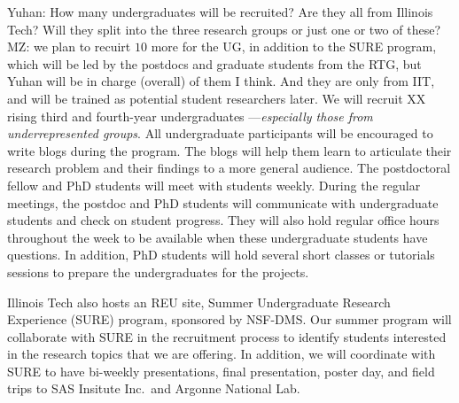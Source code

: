 \documentclass[11pt]{NSFamsart}
\newcommand{\YuhanNote}[1]{{\color{violet} Yuhan: #1}}
\begin{document}
 \YuhanNote{How many undergraduates will be recruited? Are they all from Illinois Tech? Will they split into the three research groups or just one or two of these?}{\color{blue} MZ: we plan to recuirt $10$ more for the UG, in addition to the SURE program, which will be led by the postdocs and graduate students from the RTG, but Yuhan will be in charge (overall) of them I think.  And they are only from IIT, and will be trained as potential student researchers later.}
We will recruit XX rising third and fourth-year undergraduates ---\emph{especially those from underrepresented groups}.
All undergraduate participants will be encouraged to write blogs \cite{Hig21a} during the program. The blogs will help them learn to articulate their research problem and their findings to a more general audience. The postdoctoral fellow and PhD
students will meet with students weekly. During the regular meetings, the postdoc and PhD students will communicate with undergraduate students and check on student progress. They will also hold regular office hours throughout the week to be available when these undergraduate students have questions. In addition, PhD students will hold several short classes or tutorials sessions to prepare the undergraduates for the projects.

Illinois Tech also hosts an REU site, Summer Undergraduate Research Experience (SURE)  program, sponsored by NSF-DMS.  Our summer program will collaborate with SURE in the recruitment process to identify students interested in the research topics that we are offering. In addition, we will coordinate with SURE to have bi-weekly presentations, final presentation, poster day, and field trips to SAS Insitute Inc.\ and Argonne National Lab. 

\end{document}
